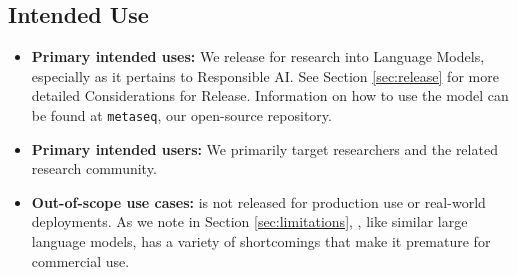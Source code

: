 \subsection{Intended Use}
\begin{itemize}
    \item \textbf{Primary intended uses:} We release \OPT{} for research into Language Models, especially as it pertains to Responsible AI. See Section \ref{sec:release} for more detailed Considerations for Release. Information on how to use the model can be found at \texttt{metaseq}, our open-source repository.
    \item \textbf{Primary intended users:} We primarily target researchers and the related research community.
    \item \textbf{Out-of-scope use cases: } \OPT{} is not released for production use or real-world deployments. As we note in Section \ref{sec:limitations}, \OPT{}, like similar large language models, has a variety of shortcomings that make it premature for commercial use.
\end{itemize}
 

